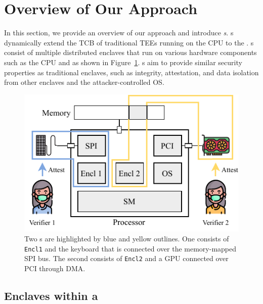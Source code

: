 \section{Overview of Our Approach}
\label{sec:overview}


In this section, we provide an overview of our approach \name and introduce \emph{\nameenclave{}s}. \Nameenclave{}s dynamically extend the TCB of traditional TEEs running on the CPU to the \sphw. \Nameenclave{}s consist of multiple distributed enclaves that run on various hardware components such as the CPU and \sphw as shown in Figure~\ref{fig:new_system}. \Nameenclave{}s aim to provide similar security properties as traditional enclaves, such as integrity, attestation, and data isolation from other enclaves and the attacker-controlled OS. 

\begin{figure}[tbp]
    \centering
    \includegraphics[width=\linewidth]{chapters/PIE/images/cpu_bus_peripheral-Page-4.pdf}
    \vspace{-2em}
    \caption{Two \nameenclave{}s are highlighted by blue and yellow outlines. One consists of \texttt{Encl1} and the keyboard that is connected over the memory-mapped SPI bus. The second consists of \texttt{Encl2} and a GPU connected over PCI through DMA.}
    \label{fig:new_system}
\end{figure}



\subsection{Enclaves within a \nameenclave}
\label{sec:overview:enclaves}

